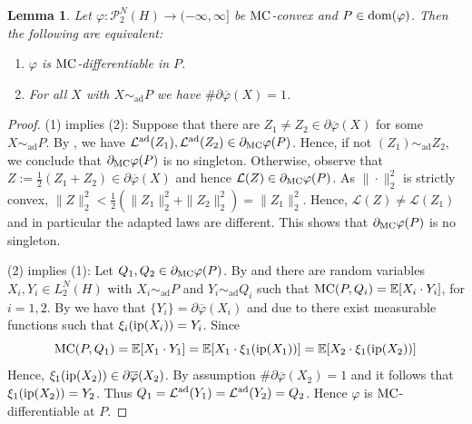 \documentclass[a4paper]{amsart}
\numberwithin{theorem}{section}
\newtheorem{lemma}[theorem]{Lemma}
\theoremstyle{definition}
\newcommand{\E}{\mathbb{E}}
\newcommand{\law}{\mathcal{L}}
\newcommand{\dom}{\textup{dom}}
\newcommand{\Pc}{\mathcal P}
\newcommand{\simad}{\sim_{\mathrm{ad}}}
\renewcommand{\H}{H}
\renewcommand{\phi}{\varphi}
\newcommand{\mc}{\textup{MC}}
\newcommand{\MC}{\textup{MC}}
\newcommand{\ip}{\textup{ip}}
\newcommand{\lawad}{\law^{\textup{ad}}}
\begin{document}
\begin{lemma}\label{lem:mc_diff_char_ad}
    Let $\phi:\Pc_2^N(\H)\to (-\infty, \infty]$ be $\MC$-convex and $P\in \dom(\phi)$. Then the following are equivalent: 
    \begin{enumerate}
        \item $\phi$ is $\MC$-differentiable in $P$.
        \item For all $X$ with $X\simad P$ we have $\# \partial \overline \phi (X) =1$.
    \end{enumerate}
\end{lemma}
\begin{proof}
(1) implies (2): Suppose that there are $Z_1 \neq Z_2 \in \partial\overline{\phi}(X)$ for some $X \simad P$. By , we have $\lawad(Z_1),\lawad(Z_2)  \in \partial_\mc\phi(P)$. Hence, if not $(Z_1) \simad Z_2$, we conclude that $\partial_\mc\phi(P)$ is no singleton. Otherwise, observe that $Z:= \frac12 (Z_1+Z_2) \in \partial\overline{\phi}(X)$ and hence $\law(Z) \in \partial_\mc\phi(P)$. As $\| \cdot \|_2^2$ is strictly convex, $\|Z\|_2^2 < \frac12 (\|Z_1\|_2^2+\|Z_2\|_2^2) = \|Z_1\|_2^2$. Hence, $\law(Z) \neq \law(Z_1)$ and in particular the adapted laws are different. This shows that $\partial_\mc\phi(P)$ is no singleton.

(2) implies (1): Let $Q_1,Q_2 \in \partial_\mc \phi(P)$.
By  and  there are random variables $X_i,Y_i \in L_2^N(H)$ with $X_i \simad P$ and $Y_i \simad Q_i$ such that $\mc(P,Q_i) = \E[X_i \cdot Y_i]$, for $i = 1,2$.
By  we have that $\{Y_i\} = \partial\overline{\phi}(X_i)$ and due to  there exist measurable functions such that $\xi_i(\ip(X_i)) = Y_i$.
Since $$\mc(P,Q_1) = \E[X_1 \cdot Y_1] =\E[ X_1 \cdot \xi_1(\ip(X_1)) ]= \E[ X_2 \cdot \xi_1(\ip(X_2)) ]$$  Hence, $\xi_1(\ip(X_2)) \in \partial \overline \phi(X_2)$. By assumption $\#\partial \overline \phi(X_2) = 1$ and it follows that $\xi_1(\ip(X_2)) = Y_2$. Thus $Q_1 = \lawad(Y_1) = \lawad(Y_2) = Q_2$. Hence $\phi$ is $\mc$-differentiable at $P$.
\end{proof}
\end{document}
